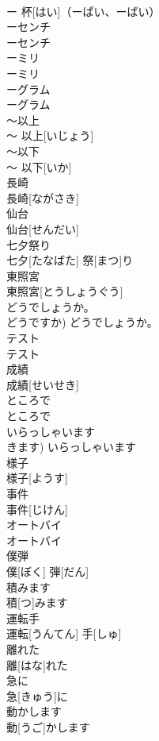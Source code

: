 \documentclass[8pt]{extreport}
\begin{document}
\begin{CJK}{UTF8}{min}
\\	ー 杯[はい]（ーぱい、ーばい）	
\\	ーセンチ	
\\	ーセンチ	
\\	ーミリ	
\\	ーミリ	
\\	ーグラム	
\\	ーグラム	
\\	〜以上	
\\	〜 以上[いじょう]	
\\	〜以下	
\\	〜 以下[いか]	
\\	長崎	
\\	長崎[ながさき]	
\\	仙台	
\\	仙台[せんだい]	
\\	七夕祭り	
\\	七夕[たなばた] 祭[まつ]り	
\\	東照宮	
\\	東照宮[とうしょうぐう]	
\\	どうでしょうか。	
\\	どうですか)	どうでしょうか。	
\\	テスト	
\\	テスト	
\\	成績	
\\	成績[せいせき]	
\\	ところで	
\\	ところで	
\\	いらっしゃいます	
\\	きます)	いらっしゃいます	
\\	様子	
\\	様子[ようす]	
\\	事件	
\\	事件[じけん]	
\\	オートバイ	
\\	オートバイ	
\\	僕弾	
\\	僕[ぼく] 弾[だん]	
\\	積みます	
\\	積[つ]みます	
\\	運転手	
\\	運転[うんてん] 手[しゅ]	
\\	離れた	
\\	離[はな]れた	
\\	急に	
\\	急[きゅう]に	
\\	動かします	
\\	動[うご]かします	

\end{CJK}
\end{document}
